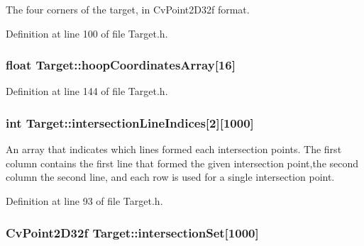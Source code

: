 The four corners of the target, in CvPoint2D32f format. 



Definition at line 100 of file Target.h.

\hypertarget{classTarget_a6f52fbce823f229f68368c241dd39f46}{
\subsubsection[{hoopCoordinatesArray}]{\setlength{\rightskip}{0pt plus 5cm}float {\bf Target::hoopCoordinatesArray}\mbox{[}16\mbox{]}}}
\label{classTarget_a6f52fbce823f229f68368c241dd39f46}


Definition at line 144 of file Target.h.

\hypertarget{classTarget_a8826919bae5e9653ab4c7b7ab6a4b03a}{
\subsubsection[{intersectionLineIndices}]{\setlength{\rightskip}{0pt plus 5cm}int {\bf Target::intersectionLineIndices}\mbox{[}2\mbox{]}\mbox{[}1000\mbox{]}}}
\label{classTarget_a8826919bae5e9653ab4c7b7ab6a4b03a}


An array that indicates which lines formed each intersection points. The first column contains the first line that formed the given intersection point,the second column the second line, and each row is used for a single intersection point. 



Definition at line 93 of file Target.h.

\hypertarget{classTarget_a26d36f01443f1f26da59e18ad4552a4f}{
\subsubsection[{intersectionSet}]{\setlength{\rightskip}{0pt plus 5cm}CvPoint2D32f {\bf Target::intersectionSet}\mbox{[}1000\mbox{]}}}
\label{classTarget_a26d36f01443f1f26da59e18ad4552a4f}



